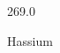 \documentclass[12pt]{article}
\begin{document}
\hfill{}
\vfill
\begin{center}
  {\fontsize{50}{60}
  }

  269.0

Hassium
\end{center}
\vfill
\end{document}
